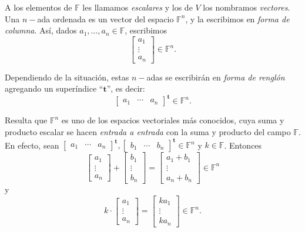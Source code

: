             A los elementos de $\mathbb{F}$ les llamamos \textit{escalares} y los de $V$ los nombramos \textit{vectores}. Una $n-$ada ordenada es un vector del espacio $\mathbb{F}^{n}$, y la escribimos en \textit{forma de columna}. Así, dados $a_{1}, \ldots, a_{n} \in \mathbb{F}$, escribimos 
                $$
                \begin{bmatrix}
                    a_{1} \\
                    \vdots \\
                    a_{n}
                \end{bmatrix} \in \mathbb{F}^{n}.
                $$

            Dependiendo de la situación, estas $n-$adas se escribirán en \textit{forma de renglón} agregando un superíndice ``$\mathbf{t}$'', es decir:
                $$
                \begin{bmatrix}
                    a_{1} & \cdots & a_{n}
                \end{bmatrix} ^{\mathbf{t}} \in \mathbb{F}^{n}.
                $$

            Resulta que $\mathbb{F}^{n}$ es uno de los espacios vectoriales más conocidos, cuya suma y producto escalar se hacen \textit{entrada a entrada} con la suma y producto del campo $\mathbb{F}$. En efecto, sean $\begin{bmatrix} a_{1} & \cdots & a_{n}\end{bmatrix} ^{\mathbf{t}}, \begin{bmatrix} b_{1} & \cdots & b_{n} \end{bmatrix} ^{\mathbf{t}} \in \mathbb{F}^{n}$ y $k \in \mathbb{F}$. Entonces
                $$
                \begin{bmatrix}
                a_{1} \\
                \vdots \\
                a_{n}
                \end{bmatrix} + \begin{bmatrix}
                b_{1} \\
                \vdots \\
                b_{n}
                \end{bmatrix}  =\begin{bmatrix}
                a_{1} + b_{1} \\
                \vdots \\
                a_{n} + b_{n}
                \end{bmatrix} \in \mathbb{F}^{n}
                $$ y $$ k \cdot\begin{bmatrix}
                a_{1} \\
                \vdots \\
                a_{n}
                \end{bmatrix} = \begin{bmatrix}
                ka_{1} \\
                \vdots \\
                ka_{n}
                \end{bmatrix} \in \mathbb{F}^{n}.$$

